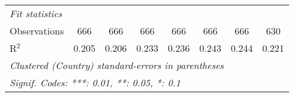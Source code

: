 \begin{tabular}{lccccccc}
   \midrule \emph{Fit statistics}\\
   Observations                                                              & 666          & 666          & 666            & 666            & 666            & 666            & 630\\  
   R$^2$                                                                     & 0.205        & 0.206        & 0.233          & 0.236          & 0.243          & 0.244          & 0.221\\  
   \midrule
   \multicolumn{8}{l}{\emph{Clustered (Country) standard-errors in parentheses}}\\
   \multicolumn{8}{l}{\emph{Signif. Codes: ***: 0.01, **: 0.05, *: 0.1}}\\
\end{tabular}
\par\endgroup


